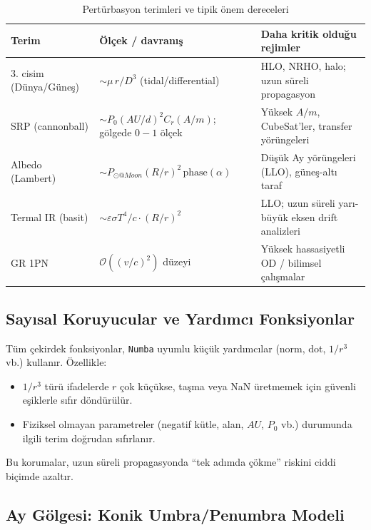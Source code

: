 \begin{table}[H]
\centering
\caption{Pertürbasyon terimleri ve tipik önem dereceleri}
\label{tab:pert_models}
\small
\begin{tabular}{p{3.3cm} p{6.2cm} p{5.1cm}}
\hline
\textbf{Terim} & \textbf{Ölçek / davranış} & \textbf{Daha kritik olduğu rejimler} \\
\hline
3. cisim (Dünya/Güneş) &
$\sim \mu\, r / D^3$ (tidal/differential) &
HLO, NRHO, halo; uzun süreli propagasyon \\

SRP (cannonball) &
$\sim P_0(AU/d)^2 C_r(A/m)$; gölgede $0\!-\!1$ ölçek &
Yüksek $A/m$, CubeSat’ler, transfer yörüngeleri \\

Albedo (Lambert) &
$\sim P_{\odot@Moon}(R/r)^2\,\mathrm{phase}(\alpha)$ &
Düşük Ay yörüngeleri (LLO), güneş-altı taraf \\

Termal IR (basit) &
$\sim \varepsilon\sigma T^4/c \cdot (R/r)^2$ &
LLO; uzun süreli yarı-büyük eksen drift analizleri \\

GR 1PN &
$\mathcal{O}((v/c)^2)$ düzeyi &
Yüksek hassasiyetli OD / bilimsel çalışmalar \\
\hline
\end{tabular}
\end{table}

\subsection*{Sayısal Koruyucular ve Yardımcı Fonksiyonlar}

Tüm çekirdek fonksiyonlar, \texttt{Numba} uyumlu küçük yardımcılar
(norm, dot, $1/r^3$ vb.) kullanır.
Özellikle:
\begin{itemize}
  \item $1/r^3$ türü ifadelerde $r$ çok küçükse,
        taşma veya NaN üretmemek için
        güvenli eşiklerle sıfır döndürülür.
  \item Fiziksel olmayan parametreler
        (negatif kütle, alan, $AU$, $P_0$ vb.)
        durumunda ilgili terim doğrudan sıfırlanır.
\end{itemize}
Bu korumalar, uzun süreli propagasyonda
``tek adımda çökme'' riskini ciddi biçimde azaltır.

\subsection*{Ay Gölgesi: Konik Umbra/Penumbra Modeli}

